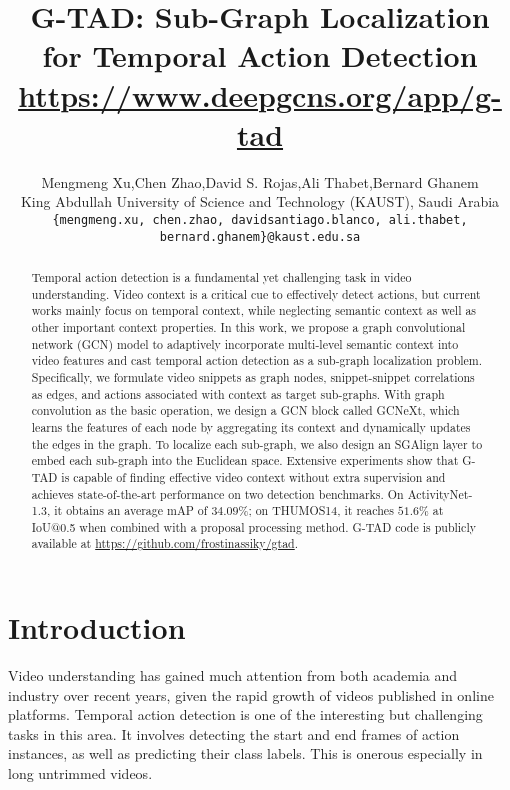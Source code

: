 \documentclass[10pt,twocolumn,letterpaper]{article}
\begin{document}
\title{G-TAD: Sub-Graph Localization for Temporal Action Detection \\ \small\url{https://www.deepgcns.org/app/g-tad }}

\author{Mengmeng Xu,\quad Chen Zhao,\quad David S. Rojas,\quad Ali         Thabet,\quad Bernard Ghanem\\
King Abdullah University of Science and Technology (KAUST), Saudi Arabia\\
		{\tt\footnotesize \{mengmeng.xu, chen.zhao, davidsantiago.blanco, ali.thabet, bernard.ghanem\}@kaust.edu.sa}}

\maketitle


\begin{abstract}
Temporal action detection is a fundamental yet challenging task in video understanding. Video context is a critical cue to effectively detect actions, but current works mainly focus on temporal context, while neglecting semantic context as well as other important context properties. In this work, we propose a graph convolutional network (GCN) model to adaptively incorporate  multi-level semantic context into video features and cast temporal action detection as a sub-graph localization problem. Specifically, we formulate video snippets as graph nodes, snippet-snippet correlations as edges, and actions associated with context as target sub-graphs. With graph convolution as the basic operation, we design a GCN block called GCNeXt, which learns the features of each node by aggregating its context and dynamically updates the edges in the graph. To localize each sub-graph, we also design an SGAlign layer to embed each sub-graph into the Euclidean space. Extensive experiments show that G-TAD is capable of finding effective video context without extra supervision and achieves state-of-the-art performance on two detection benchmarks. On ActivityNet-1.3, it obtains an average mAP of $34.09\%$; on THUMOS14, it reaches $51.6\%$ at IoU@0.5 when combined with a proposal processing method. G-TAD code is publicly available at \href{https://github.com/frostinassiky/gtad}{https://github.com/frostinassiky/gtad}.




\end{abstract}

\section{Introduction}
Video understanding has gained much attention from both academia and industry over recent years, given the rapid growth of videos published in online platforms. Temporal action detection is one of the interesting but challenging tasks in this area.
It involves detecting the start and end frames of action instances, as well as predicting their class labels. This is onerous especially in long untrimmed videos. 
\end{document}
